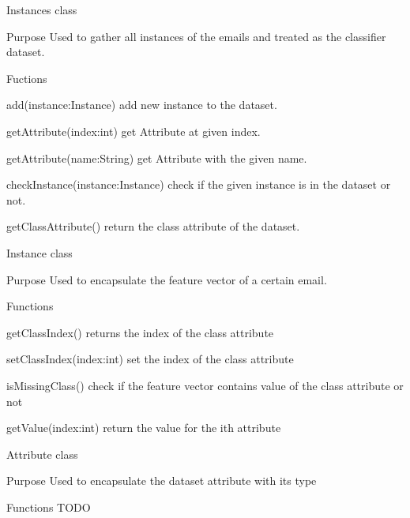 \documentclass[12pt]{article}
\newenvironment{my_itemize}
{\begin{itemize}
  \setlength{\itemsep}{0cm}
  \setlength{\parskip}{0cm}}
{\end{itemize}}
\newenvironment{my_desc}
{\begin{description}
  \setlength{\itemsep}{0cm}
  \setlength{\parskip}{0cm}}
{\end{description}}
\begin{document}
\begin{my_itemize}
\begin{my_desc}
  \end{my_desc}


  \item Instances class
  \begin{my_desc}
    \item[Purpose] Used to gather all instances of the emails and treated as the classifier
      dataset.
    \item[Fuctions] \hfill
    \begin{my_itemize}
      \item add(instance:Instance) add new instance to the dataset.
      \item getAttribute(index:int) get Attribute at given index.
      \item getAttribute(name:String) get Attribute with the given name.
      \item checkInstance(instance:Instance) check if the given instance is in the dataset or not.
      \item getClassAttribute() return the class attribute of the dataset.
    \end{my_itemize}

  \end{my_desc}

  \item Instance class
  \begin{my_desc}
    \item[Purpose] Used to encapsulate the feature vector of a certain email.
    \item[Functions] \hfill
    \begin{my_itemize}
      \item getClassIndex() returns the index of the class attribute
      \item setClassIndex(index:int) set the index of the class attribute
      \item isMissingClass() check if the feature vector contains value of the class attribute or not
      \item getValue(index:int) return the value for the ith attribute
    \end{my_itemize}

  \end{my_desc}

  \item Attribute class
  \begin{my_desc}
    \item[Purpose] Used to encapsulate the dataset attribute with its type
    \item[Functions] TODO
  \end{my_desc}

\end{my_itemize}
\end{document}
